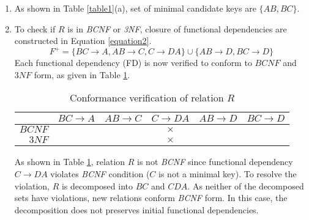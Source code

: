 \begin{enumerate}
	\begin{enumerate}[label=(\alph*)]
	\item As shown in Table \ref{table1}(a), set of minimal candidate keys are $\{AB, BC\}$.
	\item To check if $R$ is in \textit{BCNF} or \textit{3NF}, closure of functional dependencies are constructed in Equation \ref{equation2}.
	\begin{equation}\label{equation2}
	F^+ = \{BC\rightarrow A, AB\rightarrow C, C\rightarrow DA\} \cup \{AB\rightarrow D, BC\rightarrow D\}
	\end{equation}
	Each functional dependency (FD) is now verified to conform to $BCNF$ and $3NF$ form, as given in Table \ref{table3}.
	\begin{table}[H]
	\centering\caption{Conformance verification of relation $R$}\label{table3}
	\begin{tabular}{|r||c|c|c|c|c|}
	\hline
	 & $BC\rightarrow A$ & $AB\rightarrow C$ & $C\rightarrow DA$ & $AB\rightarrow D$ & $BC\rightarrow D$ \\
	\hline
	$BCNF$ & \checkmark & \checkmark & $\times$ & \checkmark & \checkmark \\
	$3NF$ & \checkmark & \checkmark & $\times$ & \checkmark & \checkmark \\
	\hline
	\end{tabular}
	\end{table}
	As shown in Table \ref{table3}, relation $R$ is not \textit{BCNF} since functional dependency $C\rightarrow DA$ violates \textit{BCNF} condition ($C$ is not a minimal key).
	To resolve the violation, $R$ is decomposed into $BC$ and $CDA$.
	As neither of the decomposed sets have violations, new relations conform \textit{BCNF} form.
In this case, the decomposition does not preserves initial functional dependencies.
	\end{enumerate}

\end{enumerate}
